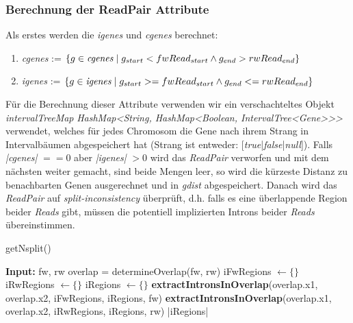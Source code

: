 \documentclass[12pt]{article}
\begin{document}
\subsubsection{Berechnung der ReadPair Attribute}
Als erstes werden die \textit{igenes} und \textit{cgenes} berechnet:
\begin{enumerate}
    \item \textit{cgenes} := $\left\{g \in \textit{cgenes} \hspace{1mm}|\hspace{1mm} g_{start } < fwRead_{start} \land g_{end} > rwRead_{end}\right\}$
    \item \textit{igenes} := $\left\{g \in \textit{igenes} \hspace{1mm}|\hspace{1mm} g_{start} >= fwRead_{start} \land g_{end} <= rwRead_{end}\right\}$
\end{enumerate}
Für die Berechnung dieser Attribute verwenden wir ein verschachteltes Objekt \textit{intervalTreeMap} \textit{HashMap<String, HashMap<Boolean, IntervalTree<Gene>\hspace{0.1mm}>\hspace{0.1mm}>}
verwendet, welches für jedes Chromosom die Gene nach ihrem Strang in Intervalbäumen abgespeichert hat (Strang ist entweder: [\textit{true}|\textit{false}|\textit{null}]).
Falls \textit{|cgenes|} $== 0$ aber \textit{|igenes|} $> 0$  wird das \textit{ReadPair} verworfen und 
mit dem nächsten weiter gemacht, sind beide Mengen leer, so wird die kürzeste Distanz zu benachbarten Genen ausgerechnet und in
\textit{gdist} abgespeichert.
Danach wird das \textit{ReadPair} auf \textit{split-inconsistency} überprüft, d.h. falls es eine überlappende 
Region beider \textit{Reads} gibt, müssen die potentiell implizierten Introns beider \textit{Reads} übereinstimmen.
\begin{algorithm}[!htbp]
\caption{getNsplit()}
\begin{algorithmic}[1]
\State \textbf{Input:} fw, rw 
    \State {} 
\EndIf
\State overlap = determineOverlap(fw, rw) 
\State iFwRegions $\gets \{\}$ 
\State iRwRegions $\gets \{\}$ 
\State iRegions $\gets \{\}$ 
\State \textbf{extractIntronsInOverlap}(overlap.x1, overlap.x2, iFwRegions, iRegions, fw) 
\State \textbf{extractIntronsInOverlap}(overlap.x1, overlap.x2, iRwRegions, iRegions, rw)
\State {} 
\EndIf
{}
\State \Return |iRegions|
\EndIf
\State {}
\end{algorithmic}
\end{algorithm}
\end{document}
